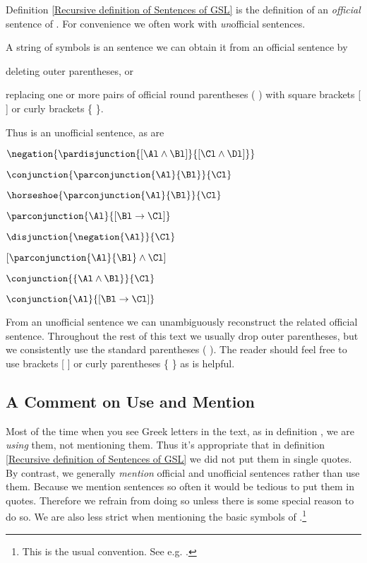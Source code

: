 Definition \ref{Recursive definition of Sentences of GSL} is the definition of an \emph{official} sentence of \GSL{}.
For convenience we often work with \emph{un}official sentences. 
\begin{majorILnc}{}
A string of symbols is an  sentence \Iff we can obtain it from an official sentence by
\begin{cenumerate}
\item deleting outer parentheses, or
\item replacing one or more pairs of official round parentheses ( ) with square brackets [ ] or curly brackets \{ \}.
\end{cenumerate}
\end{majorILnc}
\noindent{}Thus \mention{$\conjunction{\Al}{\conjunction{\Bl}{\Cl}}$} is an unofficial sentence, as are
\begin{multicols}{2}
\begin{smenumerate}
\item\label{usex1} $\negation{\pardisjunction{[\Al\wedge\Bl]}{[\Cl\wedge\Dl]}}$
\item $\conjunction{\parconjunction{\Al}{\Bl}}{\Cl}$
\item $\horseshoe{\parconjunction{\Al}{\Bl}}{\Cl}$
\item $\parconjunction{\Al}{[\Bl\rightarrow\Cl]}$
\item $\disjunction{\negation{\Al}}{\Cl}$
\item $[\parconjunction{\Al}{\Bl}\wedge\Cl]$
\item $\conjunction{\{\Al\wedge\Bl\}}{\Cl}$
\item\label{usexL} $\conjunction{\Al}{[\Bl\rightarrow\Cl]}$
\end{smenumerate}
\end{multicols}
\noindent{}From an unofficial sentence we can unambiguously reconstruct the related official sentence. 
Throughout the rest of this text we usually drop outer parentheses, but we consistently use the standard parentheses ( ). 
The reader should feel free to use brackets [ ] or curly parentheses \{ \} as is helpful. 

\subsection{A Comment on Use and Mention}\label{use mention comment}

Most of the time when you see Greek letters in the text, as in definition , we are \emph{using} them, not mentioning them. 
Thus it's appropriate that in definition \ref{Recursive definition of Sentences of GSL} we did not put them in single quotes.
By contrast, we generally \emph{mention} official and unofficial \GSL{} sentences rather than use them.
Because we mention \GSL{} sentences so often it would be tedious to put them in quotes. 
Therefore we refrain from doing so unless there is some special reason to do so.  
We are also less strict when mentioning the basic symbols of \GSL{}.\footnote{This is the usual convention. See e.g. \citealt[7]{Hodges2001}.}

